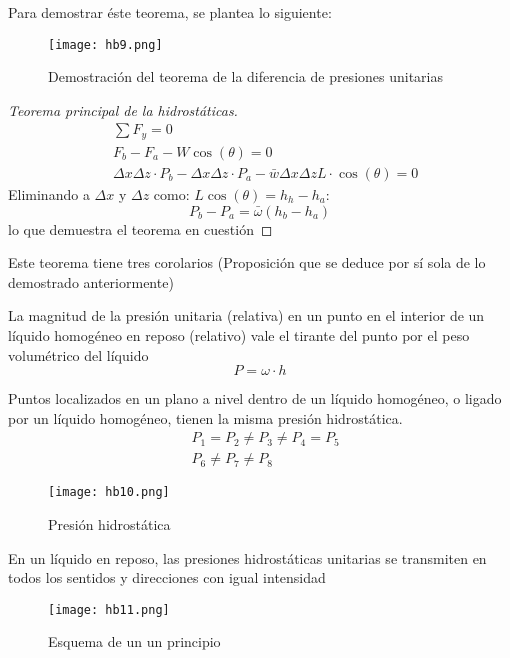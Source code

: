Para demostrar éste teorema, se plantea lo siguiente: 

\begin{figure}[h!]
  \centerline{\texttt{[image: hb9.png]}}
  \caption{Demostración del teorema de la diferencia de presiones unitarias}
  \label{hb9}
\end{figure}

\begin{proof}[Teorema principal de la hidrostáticas]
    \begin{align*}
        &\sum F_y=0\\
        &F_b-F_a-W\cos{(\theta)}=0\\
        &\Delta x\Delta z\cdot P_b-\Delta x\Delta z\cdot P_a-\bar{w}\Delta x\Delta zL\cdot \cos{(\theta)} =0
    \end{align*}
    Eliminando a $\Delta x$ y $\Delta z$ como: $L\cos{(\theta)}=h_h-h_a$:
    \begin{equation*}
        P_b-P_a=\bar{\omega}\left(h_b-h_a\right)
    \end{equation*}
    lo que demuestra el teorema en cuestión
\end{proof}
Este teorema tiene tres corolarios (Proposición que se deduce por sí sola de lo demostrado anteriormente)

\begin{corollary}
    La magnitud de la presión unitaria (relativa) en un punto en el interior de un líquido homogéneo en reposo (relativo) vale el tirante del punto por el peso volumétrico del líquido
    \begin{equation}
        P=\omega\cdot h
    \end{equation}
\end{corollary}

\begin{corollary}
    Puntos localizados en un plano a nivel dentro de un líquido homogéneo, o ligado por un líquido homogéneo, tienen la misma presión hidrostática.
    \begin{align}
        &P_1=P_2\neq P_3\neq P_4=P_5\\ 
        &P_6\neq P_7\neq P_8
    \end{align}
\end{corollary}
\begin{figure}[h!]
  \centerline{\texttt{[image: hb10.png]}}
  \caption{Presión hidrostática}
  \label{hb10}
\end{figure}

\begin{corollary}
    En un líquido en reposo, las presiones hidrostáticas unitarias se transmiten en todos los sentidos y direcciones con igual intensidad
\end{corollary}
\begin{figure}[h!]
  \centerline{\texttt{[image: hb11.png]}}
  \caption{Esquema de un un principio}
  \label{hb11}
\end{figure}


